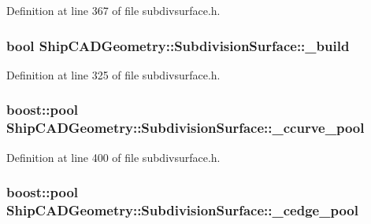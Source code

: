Definition at line 367 of file subdivsurface.\-h.

\hypertarget{classShipCADGeometry_1_1SubdivisionSurface_abdb049451d948cc92be79719e03adfff}{
\subsubsection[{\-\_\-build}]{\setlength{\rightskip}{0pt plus 5cm}bool Ship\-C\-A\-D\-Geometry\-::\-Subdivision\-Surface\-::\-\_\-build\hspace{0.3cm}{\ttfamily [protected]}}}\label{classShipCADGeometry_1_1SubdivisionSurface_abdb049451d948cc92be79719e03adfff}


Definition at line 325 of file subdivsurface.\-h.

\hypertarget{classShipCADGeometry_1_1SubdivisionSurface_a832b507f17ba2220df2edfbb342e9f40}{
\subsubsection[{\-\_\-ccurve\-\_\-pool}]{\setlength{\rightskip}{0pt plus 5cm}boost\-::pool Ship\-C\-A\-D\-Geometry\-::\-Subdivision\-Surface\-::\-\_\-ccurve\-\_\-pool\hspace{0.3cm}{\ttfamily [protected]}}}\label{classShipCADGeometry_1_1SubdivisionSurface_a832b507f17ba2220df2edfbb342e9f40}


Definition at line 400 of file subdivsurface.\-h.

\hypertarget{classShipCADGeometry_1_1SubdivisionSurface_ab66fbf875487bf60e8bfee2467ec62b0}{
\subsubsection[{\-\_\-cedge\-\_\-pool}]{\setlength{\rightskip}{0pt plus 5cm}boost\-::pool Ship\-C\-A\-D\-Geometry\-::\-Subdivision\-Surface\-::\-\_\-cedge\-\_\-pool\hspace{0.3cm}{\ttfamily [protected]}}}\label{classShipCADGeometry_1_1SubdivisionSurface_ab66fbf875487bf60e8bfee2467ec62b0}


